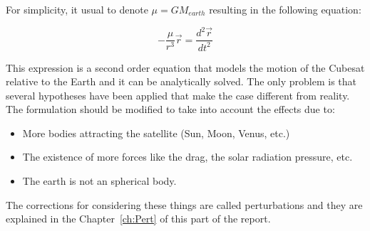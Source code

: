For simplicity, it usual to denote $\mu=GM_{earth}$ resulting in the following equation:

\begin{equation}\label{eq:a1}
-\frac{\mu}{r^3}\vec{r}=\frac{d^2 \vec{r}}{d t^2}
\end{equation}

This expression is a second order equation that models the motion of the Cubesat relative to the Earth and it can be analytically solved. The only problem is that several hypotheses have been applied that make the case different from reality. The formulation should be modified to take into account the effects due to:
\begin{itemize}
	\item More bodies attracting the satellite (Sun, Moon, Venus, etc.)
	\item The existence of more forces like the drag, the solar radiation pressure, etc.
	\item The earth is not an spherical body.
\end{itemize}
The corrections for considering these things are called perturbations and they are explained in the Chapter~\ref{ch:Pert} of this part of the report.
	